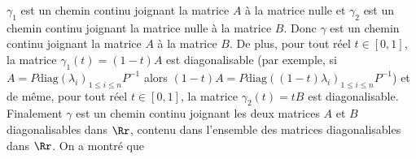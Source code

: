{\begin{enumerate}
{ 
$\gamma_1$ est un chemin continu joignant la matrice $A$ à la matrice nulle et $\gamma_2$ est un chemin continu joignant la matrice nulle à la matrice $B$. Donc $\gamma$ est un chemin continu joignant la matrice $A$ à la matrice $B$. De plus, pour tout réel $t\in[0,1]$, la matrice $\gamma_1(t)=(1-t)A$ est diagonalisable (par exemple, si $A=P\text{diag}(\lambda_i)_{1\leqslant i\leqslant n}P^{-1}$ alors $(1-t)A=P\text{diag}((1-t)\lambda_i)_{1\leqslant i\leqslant n}P^{-1}$) et de même, pour tout réel $t\in[0,1]$, la matrice $\gamma_2(t)=tB$ est diagonalisable. Finalement $\gamma$ est un chemin continu joignant les deux matrices $A$ et $B$ diagonalisables dans $\Rr$, contenu dans l'ensemble des matrices diagonalisables dans $\Rr$. On a montré que

\begin{center}
\end{center}}
\end{enumerate}
}
